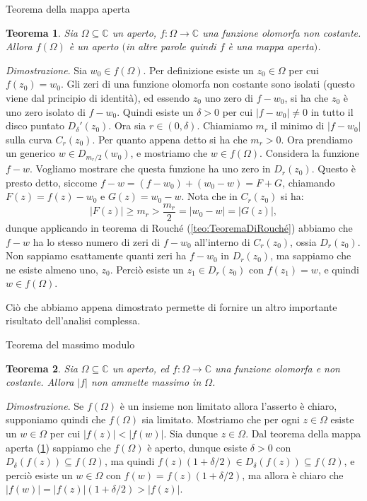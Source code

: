 \documentclass[11pt]{book}
\makeatletter
\theoremstyle{Definizione}
\theoremstyle{TeoremaProposizioneLemmaCorollarioCongettura}
\newtheorem{myteo}{Teorema}[section]
\theoremstyle{OsservazioneNotaEsempio}
\renewenvironment{proof}[1][\proofname]{\par
  \normalfont \topsep6\p@\@plus6\p@\relax
  \trivlist
  \item[\hskip\labelsep
        \itshape
    #1\@addpunct{.}]\ignorespaces
}{%
  \endtrivlist\@endpefalse
}
\renewenvironment{proof}{\textsl{Dimostrazione}.}{}
\newcommand{\C}{\mathbb{C}}
\newcommand{\Disc}[3][]{D^{#1}_{{#2}}({#3})}
\newcommand{\DiscPunt}[2]{D_{#1}'({#2})}
\makeatother
\begin{document}
\begin{boxteo}{Teorema della mappa aperta}
\begin{myteo}\label{teo:TeoremaDellaMappaAperta}
Sia $\Omega\subseteq \C$ un aperto, $f:\Omega \longrightarrow \C$ una funzione olomorfa non costante. Allora $f(\Omega)$ è un aperto $($in altre parole quindi $f$ è una mappa aperta$)$.
\end{myteo}
\tcblower
\begin{proof}
Sia $w_0\in f(\Omega)$. Per definizione esiste un $z_0\in \Omega$ per cui $f(z_0) = w_0$. Gli zeri di una funzione olomorfa non costante sono isolati (questo viene dal principio di identità), ed essendo $z_0$ uno zero di $f-w_0$, si ha che $z_0$ è uno zero isolato di $f-w_0$. Quindi esiste un $\delta > 0$ per cui $|f-w_0| \neq 0$ in tutto il disco puntato $\DiscPunt{\delta}{z_0}$. Ora sia $r\in (0,\delta)$. Chiamiamo $m_r$ il minimo di $|f-w_0|$ sulla curva $C_r(z_0)$. Per quanto appena detto si ha che $m_r > 0$. Ora prendiamo un generico $w\in \Disc{m_r/2}{w_0}$, e mostriamo che $w\in f(\Omega)$. Considera la funzione $f-w$. Vogliamo mostrare che questa funzione ha uno zero in $\Disc{r}{z_0}$. Questo è presto detto, siccome $f-w = (f-w_0)+(w_0-w) = F+G$, chiamando $F(z) = f(z)-w_0$ e $G(z) = w_0-w$. Nota che in $C_r(z_0)$ si ha:
$$
|F(z)| \geq m_r > \frac{m_r}{2} = |w_0-w| = |G(z)|,
$$
dunque applicando in teorema di Rouché (\ref{teo:TeoremaDiRouché}) abbiamo che $f-w$ ha lo stesso numero di zeri di $f-w_0$ all'interno di $C_r(z_0)$, ossia $\Disc{r}{z_0}$. Non sappiamo esattamente quanti zeri ha $f-w_0$ in $\Disc{r}{z_0}$, ma sappiamo che ne esiste almeno uno, $z_0$. Perciò esiste un $z_1\in \Disc{r}{z_0}$ con $f(z_1) = w$, e quindi $w\in f(\Omega)$.
\end{proof}
\end{boxteo}
\noindent
Ciò che abbiamo appena dimostrato permette di fornire un altro importante risultato dell'analisi complessa. 
\begin{boxteo}{Teorema del massimo modulo}
\begin{myteo}\label{teo:TeoremaDelMassimoModulo}
Sia $\Omega\subseteq \C$ un aperto, ed $f:\Omega\longrightarrow \C$ una funzione olomorfa e non costante. Allora $|f|$ non ammette massimo in $\Omega$.
\end{myteo}
\tcblower
\begin{proof}
Se $f(\Omega)$ è un insieme non limitato allora l'asserto è chiaro, supponiamo quindi che $f(\Omega)$ sia limitato. Mostriamo che per ogni $z\in \Omega$ esiste un $w\in \Omega$ per cui $|f(z)| < |f(w)|$. Sia dunque $z\in \Omega$. Dal teorema della mappa aperta (\ref{teo:TeoremaDellaMappaAperta}) sappiamo che $f(\Omega)$ è aperto, dunque esiste $\delta > 0$ con $\Disc{\delta}{f(z)} \subseteq f(\Omega)$, ma quindi $f(z)(1+\delta/2)\in \Disc{\delta}{f(z)}\subseteq f(\Omega)$, e perciò esiste un $w\in \Omega$ con $f(w) = f(z)(1+\delta/2)$, ma allora è chiaro che $|f(w)| = |f(z)|(1+\delta/2) > |f(z)|$.
\end{proof}
\end{boxteo}
\end{document}
